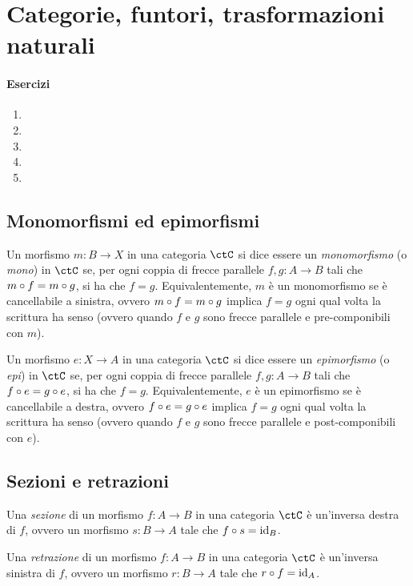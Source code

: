 \chapter{Categorie, funtori, trasformazioni naturali}
\subsubsection*{Esercizi}
\begin{enumerate}
    \item 
    \item 
    \item 
    \item 
    \item 
\end{enumerate}

\section{Monomorfismi ed epimorfismi}

\begin{definition}[Monomorfismo]
	Un morfismo \(m \colon B \to X\) in una categoria \(\ctC\) si dice essere un \emph{monomorfismo} (o \emph{mono}) in \(\ctC\) se, per ogni coppia di frecce parallele \(f, g \colon A \to B\) tali che \(m \circ f = m \circ g\), si ha che \(f = g\).
	Equivalentemente, \(m\) è un monomorfismo se è cancellabile a sinistra, ovvero \(m \circ f = m \circ g\) implica \(f = g\) ogni qual volta la scrittura ha senso (ovvero quando \(f\) e \(g\) sono frecce parallele e pre-componibili con \(m\)).
\end{definition}

\begin{definition}[Epimorfismo]
	Un morfismo \(e \colon X \to A\) in una categoria \(\ctC\) si dice essere un \emph{epimorfismo} (o \emph{epi}) in \(\ctC\) se, per ogni coppia di frecce parallele \(f, g \colon A \to B\) tali che \(f \circ e = g \circ e\), si ha che \(f = g\).
	Equivalentemente, \(e\) è un epimorfismo se è cancellabile a destra, ovvero \(f \circ e = g \circ e\) implica \(f = g\) ogni qual volta la scrittura ha senso (ovvero quando \(f\) e \(g\) sono frecce parallele e post-componibili con \(e\)).
\end{definition}



\section{Sezioni e retrazioni}

\begin{definition}[Sezione]
	Una \emph{sezione} di un morfismo \(f \colon A \to B\) in una categoria \(\ctC\) è un'inversa destra di \(f\), ovvero un morfismo \(s \colon B \to A\) tale che \(f \circ s = \mathrm{id}_{B}\).
\end{definition}

\begin{definition}[Retrazione]
	Una \emph{retrazione} di un morfismo \(f \colon A \to B\) in una categoria \(\ctC\) è un'inversa sinistra di \(f\), ovvero un morfismo \(r \colon B \to A\) tale che \(r \circ f = \mathrm{id}_{A}\).
\end{definition}